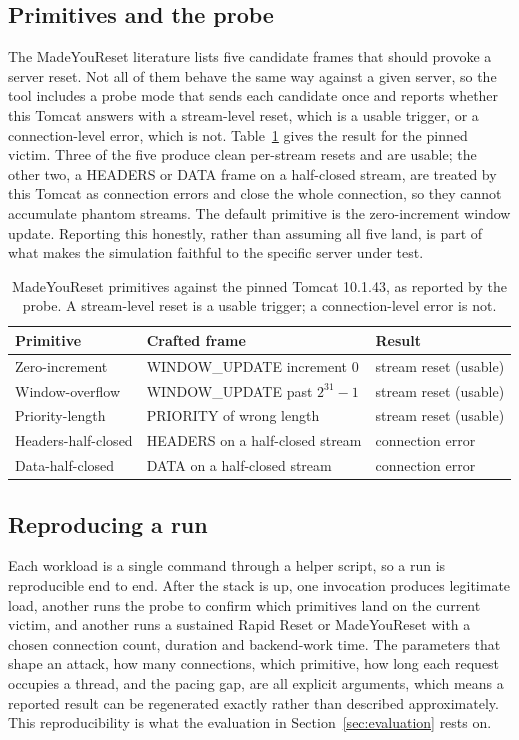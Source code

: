 \documentclass[a4paper,fleqn]{cas-dc}
\begin{document}
\subsection{Primitives and the probe}\label{sec:primitives}

The MadeYouReset literature lists five candidate frames that should provoke a server reset. Not all of them behave the same way against a given server, so the tool includes a probe mode that sends each candidate once and reports whether this Tomcat answers with a stream-level reset, which is a usable trigger, or a connection-level error, which is not. Table~\ref{tab:primitives} gives the result for the pinned victim. Three of the five produce clean per-stream resets and are usable; the other two, a HEADERS or DATA frame on a half-closed stream, are treated by this Tomcat as connection errors and close the whole connection, so they cannot accumulate phantom streams. The default primitive is the zero-increment window update. Reporting this honestly, rather than assuming all five land, is part of what makes the simulation faithful to the specific server under test.

\begin{table}[tp]
\centering
\caption{MadeYouReset primitives against the pinned Tomcat 10.1.43, as reported by the probe. A stream-level reset is a usable trigger; a connection-level error is not.}
\label{tab:primitives}
\begin{tabular}{@{}lll@{}}
\toprule
Primitive & Crafted frame & Result \\
\midrule
Zero-increment & WINDOW\_UPDATE increment 0 & stream reset (usable) \\
Window-overflow & WINDOW\_UPDATE past $2^{31}-1$ & stream reset (usable) \\
Priority-length & PRIORITY of wrong length & stream reset (usable) \\
Headers-half-closed & HEADERS on a half-closed stream & connection error \\
Data-half-closed & DATA on a half-closed stream & connection error \\
\bottomrule
\end{tabular}
\end{table}

\subsection{Reproducing a run}\label{sec:reproduce}

Each workload is a single command through a helper script, so a run is reproducible end to end. After the stack is up, one invocation produces legitimate load, another runs the probe to confirm which primitives land on the current victim, and another runs a sustained Rapid Reset or MadeYouReset with a chosen connection count, duration and backend-work time. The parameters that shape an attack, how many connections, which primitive, how long each request occupies a thread, and the pacing gap, are all explicit arguments, which means a reported result can be regenerated exactly rather than described approximately. This reproducibility is what the evaluation in Section~\ref{sec:evaluation} rests on.
\end{document}
